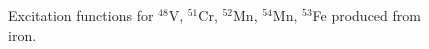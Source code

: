 \documentclass[a4paper,11pt,twoside]{book}
\begin{document}
\begin{figure}
    \quad
    \quad
      \caption{Excitation functions for $^{48}$V, $^{51}$Cr, $^{52}$Mn, $^{54}$Mn, $^{53}$Fe produced from iron.  }%
    \label{fig:cross-sections_188,189Ir}%
\end{figure} 
\end{document}
